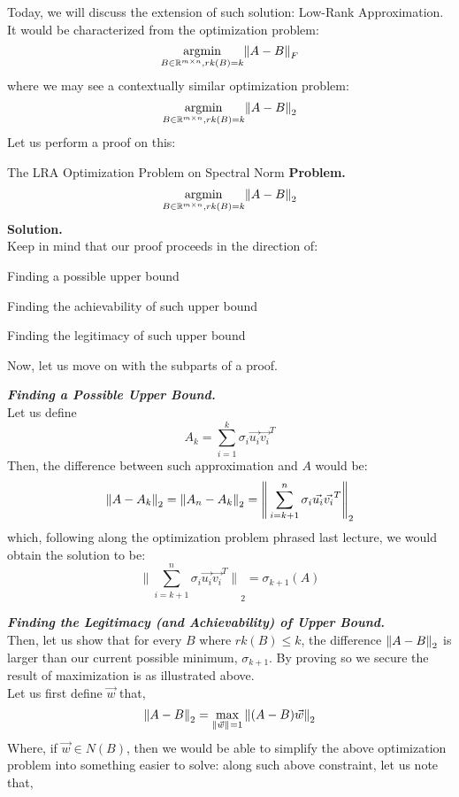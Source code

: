 Today, we will discuss the extension of such solution: Low-Rank Approximation. \\
It would be characterized from the optimization problem:
\[
    \underset{B \in \mathbb{R}^{m \times n}, rk(B) = k}{\text{argmin}} {\| A - B \|}_{F}^{}
\]
where we may see a contextually similar optimization problem:
\[
    \underset{B \in \mathbb{R}^{m \times n}, rk(B) = k}{\text{argmin}} {\| A - B \|}_{2}^{}
\]
Let us perform a proof on this:
\begin{ln-explain}{The LRA Optimization Problem on Spectral Norm}{}
    \textbf{Problem.}
    \[
        \underset{B \in \mathbb{R}^{m \times n}, rk(B) = k}{\text{argmin}} {\| A - B \|}_{2}^{}
    \]
    \tcblower
    \textbf{Solution.} \\
    Keep in mind that our proof proceeds in the direction of:
    \begin{bindenum}
        \item Finding a possible upper bound
        \item Finding the achievability of such upper bound
        \item Finding the legitimacy of such upper bound
    \end{bindenum}
    Now, let us move on with the subparts of a proof. \\
    \par
    \textbf{\textit{Finding a Possible Upper Bound.}} \\
    Let us define
    \[
        A_k = \sum_{i = 1}^k \sigma_i \vec{u_i} \vec{v_i}^T
    \]
    Then, the difference between such approximation and $A$ would be:
    \[{\| A - A_k \|}_{2}^{} = {\| A_n - A_k \|}_{2}^{} = {\Bigg\| \sum_{i = k + 1}^n \sigma_i \vec{u_i} \vec{v_i}^T \Bigg\|}_2\]
    which, following along the optimization problem phrased last lecture, we would obtain the solution to be:
    \[
        {\Bigg\| \sum_{i = k + 1}^n \sigma_i \vec{u_i} \vec{v_i}^T \Bigg\|}_2 = \sigma_{k + 1} (A)
    \]
    \par
    \textbf{\textit{Finding the Legitimacy (and Achievability) of Upper Bound.}} \\
    Then, let us show that for every $B$ where $rk(B) \leq k$, the difference ${\| A - B \|}_{2}^{}$ is larger than our current possible minimum, $\sigma_{k + 1}$. By proving so we secure the result of maximization is as illustrated above. \\
    Let us first define $\vec{w}$ that,
    \[
        {\| A - B \|}_{2}^{} = \max_{{\| \vec{w} \|}_{}^{} = 1} {\| (A - B) \vec{w} \|}_{2}^{}
    \]
    Where, if $\vec{w} \in N(B)$, then we would be able to simplify the above optimization problem into something easier to solve: along such above constraint, let us note that,

\end{ln-explain}
